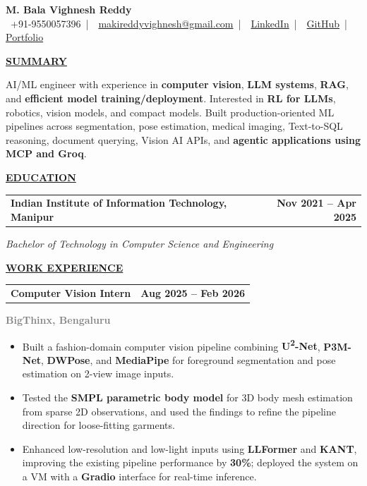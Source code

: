 \documentclass[a4paper,11pt]{article}
\newcommand{\TitleText}[1]{\textbf{\large #1}}
\newcommand{\BlackBold}[1]{\textbf{#1}}
\newcommand{\GrayText}[1]{\textcolor{graytext}{\textbf{#1}}}
\newcommand{\SectionHeader}[1]{%
  \vspace{2mm}%
  \begin{center}
    {\large\textbf{\underline{#1}}}%
  \end{center}
  \vspace{-2mm}%
}
\begin{document}
\begin{center}
  {\Large\selectfont\textbf{M. Bala Vighnesh Reddy}}\\[5pt]
  {\fontsize{11pt}{13pt}\selectfont
    \faPhone \, +91-9550057396
    \,|\,
    \faEnvelope \, \href{mailto:makireddyvighnesh@gmail.com}{\textcolor{linkblue}{makireddyvighnesh@gmail.com}}
    \,|\,
    \faLinkedin \, \href{https://www.linkedin.com/in/makireddy-bala-vighnesh-324278253}{\textcolor{linkblue}{LinkedIn}}
    \,|\,
    \faGithub \, \href{https://github.com/Makireddyvighnesh}{\textcolor{linkblue}{GitHub}}
    \,|\,
    \href{https://makireddyvighnesh.github.io/Makireddyvighnesh/}{\textcolor{linkblue}{Portfolio}}
  }
\end{center}

\SectionHeader{SUMMARY}
AI/ML engineer with experience in \BlackBold{computer vision}, \BlackBold{LLM systems}, \BlackBold{RAG}, and \BlackBold{efficient model training/deployment}. Interested in \BlackBold{RL for LLMs}, robotics, vision models, and compact models. Built production-oriented ML pipelines across segmentation, pose estimation, medical imaging, Text-to-SQL reasoning, document querying, Vision AI APIs, and \BlackBold{agentic applications using MCP and Groq}.

\SectionHeader{EDUCATION}
\begin{tabularx}{\textwidth}{@{} X r @{}}
  {\TitleText{Indian Institute of Information Technology, Manipur}} & {\large \textbf{Nov 2021 -- Apr 2025}} \\
\end{tabularx}
\textit{Bachelor of Technology in Computer Science and Engineering}

\SectionHeader{WORK EXPERIENCE}

\begin{tabularx}{\textwidth}{@{} X r @{}}
  {\TitleText{Computer Vision Intern}} & {\large \textbf{Aug 2025 -- Feb 2026}} \\
\end{tabularx}
\GrayText{BigThinx, Bengaluru}\\[-3mm]
{\normalsize
\begin{itemize}
  \item Built a fashion-domain computer vision pipeline combining \BlackBold{U\textsuperscript{2}-Net}, \BlackBold{P3M-Net}, \BlackBold{DWPose}, and \BlackBold{MediaPipe} for foreground segmentation and pose estimation on 2-view image inputs.
  \item Tested the \BlackBold{SMPL parametric body model} for 3D body mesh estimation from sparse 2D observations, and used the findings to refine the pipeline direction for loose-fitting garments.
  \item Enhanced low-resolution and low-light inputs using \BlackBold{LLFormer} and \BlackBold{KANT}, improving the existing pipeline performance by \BlackBold{30\%}; deployed the system on a VM with a \BlackBold{Gradio} interface for real-time inference.
\end{itemize}
}
\end{document}
